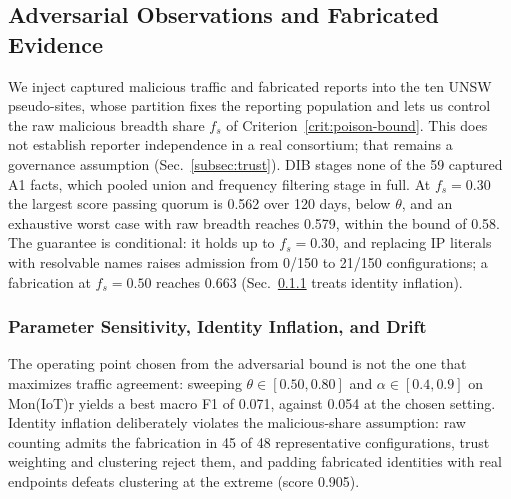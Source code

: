 \subsection{Adversarial Observations and Fabricated Evidence}
\label{sec:security-results}
We inject captured malicious traffic and fabricated reports into the ten UNSW pseudo-sites, whose partition fixes the reporting population and lets us control the raw malicious breadth share $f_s$ of Criterion~\ref{crit:poison-bound}. This does not establish reporter independence in a real consortium; that remains a governance assumption (Sec.~\ref{subsec:trust}). DIB stages none of the 59 captured A1 facts, which pooled union and frequency filtering stage in full. At $f_s=0.30$ the largest score passing quorum is 0.562 over 120 days, below $\theta$, and an exhaustive worst case with raw breadth reaches 0.579, within the bound of 0.58. The guarantee is conditional: it holds up to $f_s=0.30$, and replacing IP literals with resolvable names raises admission from 0/150 to 21/150 configurations; a fabrication at $f_s=0.50$ reaches 0.663 (Sec.~\ref{sec:sensitivity-results} treats identity inflation). \subsubsection{Parameter Sensitivity, Identity Inflation, and Drift}
\label{sec:sensitivity-results}
The operating point chosen from the adversarial bound is not the one that maximizes traffic agreement: sweeping $\theta\in[0.50,0.80]$ and $\alpha\in[0.4,0.9]$ on Mon(IoT)r yields a best macro F1 of 0.071, against 0.054 at the chosen setting. Identity inflation deliberately violates the malicious-share assumption: raw counting admits the fabrication in 45 of 48 representative configurations, trust weighting and clustering reject them, and padding fabricated identities with real endpoints defeats clustering at the extreme (score 0.905).

